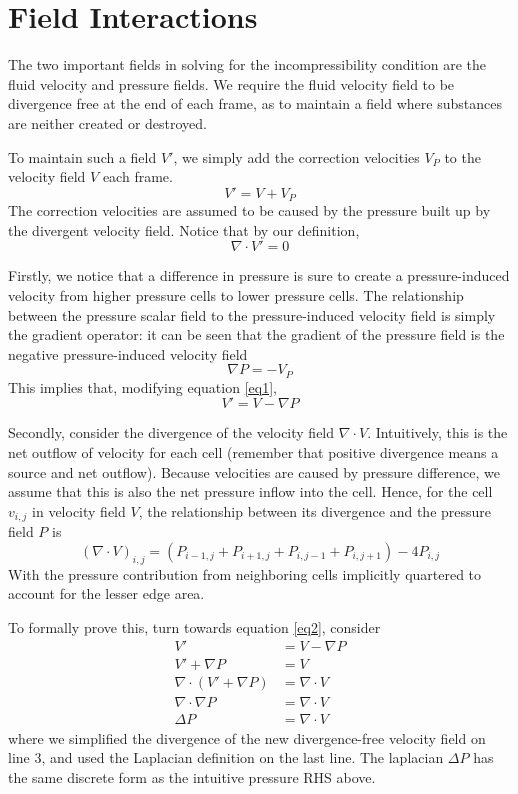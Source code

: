 \documentclass[11pt]{article}
\begin{document}
\section{Field Interactions}
The two important fields in solving for the incompressibility condition are the fluid velocity and pressure fields. We require the fluid velocity field to be divergence free at the end of each frame, as to maintain a field where substances are neither created or destroyed.

To maintain such a field $V'$, we simply add the correction velocities $V_P$ to the velocity field $V$ each frame.
\begin{equation}
	V' = V + V_P
	\label{eq1}
\end{equation}
The correction velocities are assumed to be caused by the pressure built up by the divergent velocity field. Notice that by our definition,
\[
	\nabla \cdot V' = 0
\]


Firstly, we notice that a difference in pressure is sure to create a pressure-induced velocity from higher pressure cells to lower pressure cells. The relationship between the pressure scalar field to the pressure-induced velocity field is simply the gradient operator: it can be seen that the gradient of the pressure field is the negative pressure-induced velocity field
\[
	\nabla P = -V_P
\]
This implies that, modifying equation \ref{eq1},
\begin{equation}
	V' = V - \nabla P
	\label{eq2}
\end{equation}

Secondly, consider the divergence of the velocity field $\nabla \cdot V$. Intuitively, this is the net outflow of velocity for each cell (remember that positive divergence means a source and net outflow). Because velocities are caused by pressure difference, we assume that this is also the net pressure inflow into the cell. Hence, for the cell $v_{i,j}$ in velocity field $V$, the relationship between its divergence and the pressure field $P$ is
\begin{equation}
	(\nabla \cdot V)_{i,j} = (P_{i-1, j} + P_{i+1, j} + P_{i, j-1} + P_{i, j+1}) - 4 P_{i,j}
	\label{eq:pressure}
\end{equation}
With the pressure contribution from neighboring cells implicitly quartered to account for the lesser edge area.

To formally prove this, turn towards equation \ref{eq2}, consider
\begin{align*}
	V' &= V - \nabla P\\
	V' + \nabla P &= V\\
	\nabla \cdot (V' + \nabla P) &= \nabla \cdot V\\
	\nabla \cdot \nabla P &= \nabla \cdot V\\
	\Delta P &= \nabla \cdot V
\end{align*}
where we simplified the divergence of the new divergence-free velocity field on line 3, and used the Laplacian definition on the last line. The laplacian $\Delta P$ has the same discrete form as the intuitive pressure RHS above.
\end{document}
